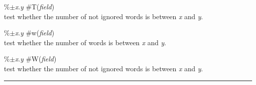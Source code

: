 \documentclass[a4paper]{article}
\newenvironment{FlatList}{\begin{list}{}{%
      \topsep=0pt\itemsep=0pt\parsep=0pt\let\makelabel=\flatlistlabel}}{\end{list}}%
\newcommand\flatlistlabel[1]{\descriptionlabel{\sf #1}}
\begin{document}
\begin{multicols}{4}
\begin{FlatList}
  \item [\%$\pm ${\it x}.{\it y}\/ \#T({\it field}\/)]\ \\
    test whether the  number of not ignored words is between {\it x}\/
    and {\it y}. 
  \item [\%$\pm ${\it x}.{\it y}\/ \#w({\it field}\/)]\ \\
    test whether the  number of words is between {\it x}\/ and {\it y}.
  \item [\%$\pm ${\it x}.{\it y}\/ \#W({\it field}\/)]\ \\
    test whether the  number of not ignored words is between {\it x}\/
    and {\it y}. 
  \end{FlatList} 
\end{multicols}
\vfill\vfill\vfill
\begin{center}\rule{.8\textwidth}{.1pt}\end{center}
\end{document}

